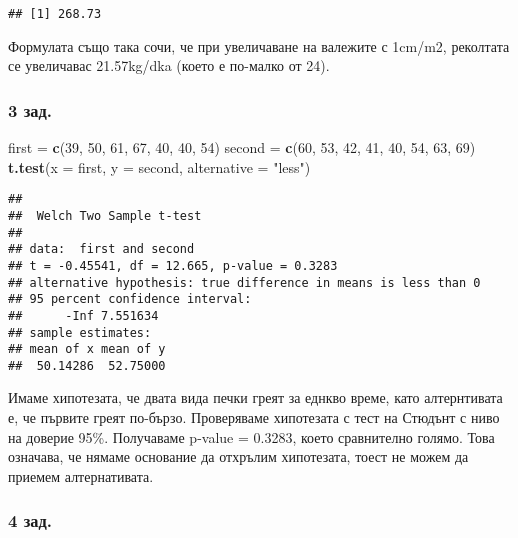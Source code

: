 \documentclass[]{article}
\newenvironment{Shaded}{\begin{snugshade}}{\end{snugshade}}
\newcommand{\KeywordTok}[1]{\textcolor[rgb]{0.13,0.29,0.53}{\textbf{#1}}}
\newcommand{\DataTypeTok}[1]{\textcolor[rgb]{0.13,0.29,0.53}{#1}}
\newcommand{\DecValTok}[1]{\textcolor[rgb]{0.00,0.00,0.81}{#1}}
\newcommand{\StringTok}[1]{\textcolor[rgb]{0.31,0.60,0.02}{#1}}
\newcommand{\NormalTok}[1]{#1}
\begin{document}
\begin{verbatim}
## [1] 268.73
\end{verbatim}

Формулата също така сочи, че при увеличаване на валежите с 1cm/m2,
реколтата се увеличавас 21.57kg/dka (което е по-малко от 24).

\subsubsection{3 зад.}\label{.-2}

\begin{Shaded}
\begin{Highlighting}[]
\NormalTok{first =}\StringTok{ }\KeywordTok{c}\NormalTok{(}\DecValTok{39}\NormalTok{, }\DecValTok{50}\NormalTok{, }\DecValTok{61}\NormalTok{, }\DecValTok{67}\NormalTok{, }\DecValTok{40}\NormalTok{, }\DecValTok{40}\NormalTok{, }\DecValTok{54}\NormalTok{)}
\NormalTok{second =}\StringTok{ }\KeywordTok{c}\NormalTok{(}\DecValTok{60}\NormalTok{, }\DecValTok{53}\NormalTok{, }\DecValTok{42}\NormalTok{, }\DecValTok{41}\NormalTok{, }\DecValTok{40}\NormalTok{, }\DecValTok{54}\NormalTok{, }\DecValTok{63}\NormalTok{, }\DecValTok{69}\NormalTok{)}
\KeywordTok{t.test}\NormalTok{(}\DataTypeTok{x =}\NormalTok{ first, }\DataTypeTok{y =}\NormalTok{ second, }\DataTypeTok{alternative =} \StringTok{"less"}\NormalTok{)}
\end{Highlighting}
\end{Shaded}

\begin{verbatim}
## 
##  Welch Two Sample t-test
## 
## data:  first and second
## t = -0.45541, df = 12.665, p-value = 0.3283
## alternative hypothesis: true difference in means is less than 0
## 95 percent confidence interval:
##      -Inf 7.551634
## sample estimates:
## mean of x mean of y 
##  50.14286  52.75000
\end{verbatim}

Имаме хипотезата, че двата вида печки греят за еднкво време, като
алтернтивата е, че първите греят по-бързо. Проверяваме хипотезата с тест
на Стюдънт с ниво на доверие 95\%. Получаваме p-value = 0.3283, което
сравнително голямо. Това означава, че нямаме основание да отхрълим
хипотезата, тоест не можем да приемем алтернативата.

\subsubsection{4 зад.}\label{.-3}
\end{document}
